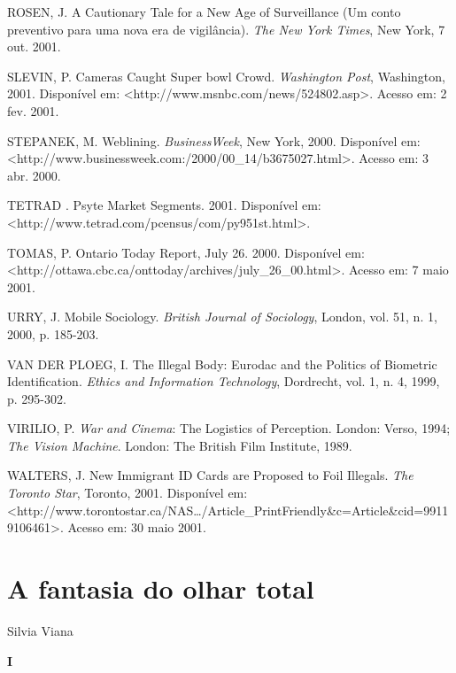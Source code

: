 ROSEN, J. A Cautionary Tale for a New Age of Surveillance (Um conto
preventivo para uma nova era de vigilância). \emph{The New York Times},
New York, 7 out. 2001.

SLEVIN, P. Cameras Caught Super bowl Crowd. \emph{Washington Post},
Washington, 2001. Disponível em:
\textless{}http://www.msnbc.com/news/524802.asp\textgreater{}. Acesso
em: 2 fev. 2001.

STEPANEK, M. Weblining. \emph{BusinessWeek}, New York, 2000. Disponível
em:
\textless{}http://www.businessweek.com:/2000/00\_14/b3675027.html\textgreater{}.
Acesso em: 3 abr. 2000.

TETRAD . Psyte Market Segments. 2001. Disponível em:
\textless{}http://www.tetrad.com/pcensus/com/py951st.html\textgreater{}.

TOMAS, P. Ontario Today Report, July 26. 2000. Disponível em:
\textless{}http://ottawa.cbc.ca/onttoday/archives/july\_26\_00.html\textgreater{}.
Acesso em: 7 maio 2001.

URRY, J. Mobile Sociology. \emph{British Journal of Sociology}, London,
vol. 51, n. 1, 2000, p. 185-203.

VAN DER PLOEG, I. The Illegal Body: Eurodac and the Politics of
Biometric Identification. \emph{Ethics and Information Technology},
Dordrecht, vol. 1, n. 4, 1999, p. 295-302.

VIRILIO, P. \emph{War and Cinema}: The Logistics of Perception. London:
Verso, 1994; \emph{The Vision Machine}. London: The British Film
Institute, 1989.

WALTERS, J. New Immigrant ID Cards are Proposed to Foil Illegals.
\emph{The Toronto Star}, Toronto, 2001. Disponível em:
\textless{}http://www.torontostar.ca/NAS\ldots{}/Article\_PrintFriendly\&c=Article\&cid=99119106461\textgreater{}.
Acesso em: 30 maio 2001.

\chapter{A fantasia do olhar
total}\label{a-fantasia-do-olhar-total}

Silvia Viana

\textbf{I}

